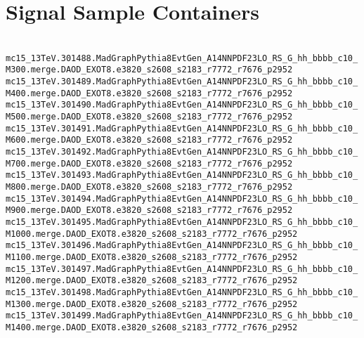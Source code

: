 \section{Signal Sample Containers} %
\label{app:signal-samples}

\noindent
\\
{\tiny
\verb|mc15_13TeV.301488.MadGraphPythia8EvtGen_A14NNPDF23LO_RS_G_hh_bbbb_c10_M300.merge.DAOD_EXOT8.e3820_s2608_s2183_r7772_r7676_p2952|\\
\verb|mc15_13TeV.301489.MadGraphPythia8EvtGen_A14NNPDF23LO_RS_G_hh_bbbb_c10_M400.merge.DAOD_EXOT8.e3820_s2608_s2183_r7772_r7676_p2952|\\
\verb|mc15_13TeV.301490.MadGraphPythia8EvtGen_A14NNPDF23LO_RS_G_hh_bbbb_c10_M500.merge.DAOD_EXOT8.e3820_s2608_s2183_r7772_r7676_p2952|\\
\verb|mc15_13TeV.301491.MadGraphPythia8EvtGen_A14NNPDF23LO_RS_G_hh_bbbb_c10_M600.merge.DAOD_EXOT8.e3820_s2608_s2183_r7772_r7676_p2952|\\
\verb|mc15_13TeV.301492.MadGraphPythia8EvtGen_A14NNPDF23LO_RS_G_hh_bbbb_c10_M700.merge.DAOD_EXOT8.e3820_s2608_s2183_r7772_r7676_p2952|\\
\verb|mc15_13TeV.301493.MadGraphPythia8EvtGen_A14NNPDF23LO_RS_G_hh_bbbb_c10_M800.merge.DAOD_EXOT8.e3820_s2608_s2183_r7772_r7676_p2952|\\
\verb|mc15_13TeV.301494.MadGraphPythia8EvtGen_A14NNPDF23LO_RS_G_hh_bbbb_c10_M900.merge.DAOD_EXOT8.e3820_s2608_s2183_r7772_r7676_p2952|\\
\verb|mc15_13TeV.301495.MadGraphPythia8EvtGen_A14NNPDF23LO_RS_G_hh_bbbb_c10_M1000.merge.DAOD_EXOT8.e3820_s2608_s2183_r7772_r7676_p2952|\\
\verb|mc15_13TeV.301496.MadGraphPythia8EvtGen_A14NNPDF23LO_RS_G_hh_bbbb_c10_M1100.merge.DAOD_EXOT8.e3820_s2608_s2183_r7772_r7676_p2952|\\
\verb|mc15_13TeV.301497.MadGraphPythia8EvtGen_A14NNPDF23LO_RS_G_hh_bbbb_c10_M1200.merge.DAOD_EXOT8.e3820_s2608_s2183_r7772_r7676_p2952|\\
\verb|mc15_13TeV.301498.MadGraphPythia8EvtGen_A14NNPDF23LO_RS_G_hh_bbbb_c10_M1300.merge.DAOD_EXOT8.e3820_s2608_s2183_r7772_r7676_p2952|\\
\verb|mc15_13TeV.301499.MadGraphPythia8EvtGen_A14NNPDF23LO_RS_G_hh_bbbb_c10_M1400.merge.DAOD_EXOT8.e3820_s2608_s2183_r7772_r7676_p2952|\\
}

